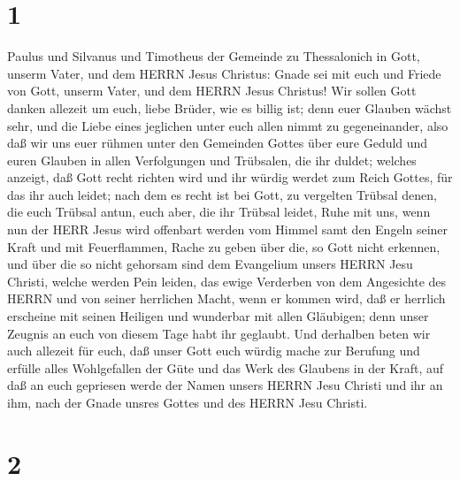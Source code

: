 \hypertarget{section}{%
\section{1}\label{section}}

 Paulus und Silvanus und Timotheus der Gemeinde zu
Thessalonich in Gott, unserm Vater, und dem HERRN Jesus Christus:
 Gnade sei mit euch und Friede von Gott, unserm Vater, und
dem HERRN Jesus Christus!  Wir sollen Gott danken allezeit
um euch, liebe Brüder, wie es billig ist; denn euer Glauben wächst sehr,
und die Liebe eines jeglichen unter euch allen nimmt zu gegeneinander,
 also daß wir uns euer rühmen unter den Gemeinden Gottes
über eure Geduld und euren Glauben in allen Verfolgungen und Trübsalen,
die ihr duldet;  welches anzeigt, daß Gott recht richten
wird und ihr würdig werdet zum Reich Gottes, für das ihr auch leidet;
 nach dem es recht ist bei Gott, zu vergelten Trübsal denen,
die euch Trübsal antun,  euch aber, die ihr Trübsal leidet,
Ruhe mit uns, wenn nun der HERR Jesus wird offenbart werden vom Himmel
samt den Engeln seiner Kraft  und mit Feuerflammen, Rache zu
geben über die, so Gott nicht erkennen, und über die so nicht gehorsam
sind dem Evangelium unsers HERRN Jesu Christi,  welche
werden Pein leiden, das ewige Verderben von dem Angesichte des HERRN und
von seiner herrlichen Macht,  wenn er kommen wird, daß er
herrlich erscheine mit seinen Heiligen und wunderbar mit allen
Gläubigen; denn unser Zeugnis an euch von diesem Tage habt ihr geglaubt.
 Und derhalben beten wir auch allezeit für euch, daß unser
Gott euch würdig mache zur Berufung und erfülle alles Wohlgefallen der
Güte und das Werk des Glaubens in der Kraft,  auf daß an
euch gepriesen werde der Namen unsers HERRN Jesu Christi und ihr an ihm,
nach der Gnade unsres Gottes und des HERRN Jesu Christi.

\hypertarget{section-1}{%
\section{2}\label{section-1}}

